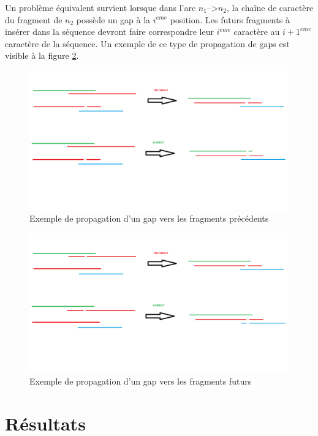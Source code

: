 \documentclass[12pt,a4paper,final]{article}
\begin{document}
Un problème équivalent survient lorsque dans l'arc $n_1$-->$n_2$, la chaîne de caractère du fragment de $n_2$ possède un gap à la $i^{eme}$ position.  Les futurs fragments à insérer dans la séquence devront faire correspondre leur $i^{eme}$ caractère au $i+1^{eme}$ caractère de la séquence.  Un exemple de ce type de propagation de gaps est visible à la figure \ref{gapSuivant}.\medskip

\begin{figure}
\centering
	\includegraphics[scale =0.4]{images/gapPrecedent.png}
	\caption{\label{gapPrecedent}Exemple de propagation d'un gap vers les fragments précédents}
\end{figure}

\begin{figure}
\centering
	\includegraphics[scale =0.4]{images/gapSuivant.png}
	\caption{\label{gapSuivant}Exemple de propagation d'un gap vers les fragments futurs}
\end{figure}

\section{Résultats}
\end{document}
